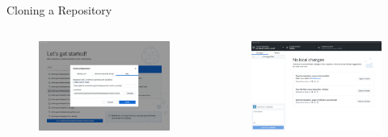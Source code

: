 \documentclass{beamer}
\begin{document}
    \begin{frame}{Cloning a Repository}
        \begin{columns}
            \begin{figure}
                \centering
                \includegraphics[width=\textwidth]{figures/clone_4.png}
            \end{figure}

            \begin{figure}
                \centering
                \includegraphics[width=\textwidth]{figures/clone_5.png}
            \end{figure}
        \end{columns}
    \end{frame}

\end{document}
